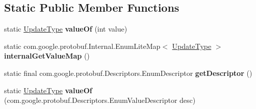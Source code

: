 \subsection*{Static Public Member Functions}
\begin{DoxyCompactItemize}
\item 
\mbox{\label{enumcom_1_1mysql_1_1cj_1_1x_1_1protobuf_1_1_mysqlx_crud_1_1_update_operation_1_1_update_type_a76b3138f10036eebc893804110d6b9cd}} 
static \mbox{\hyperlink{enumcom_1_1mysql_1_1cj_1_1x_1_1protobuf_1_1_mysqlx_crud_1_1_update_operation_1_1_update_type}{Update\+Type}} {\bfseries value\+Of} (int value)
\item 
\mbox{\label{enumcom_1_1mysql_1_1cj_1_1x_1_1protobuf_1_1_mysqlx_crud_1_1_update_operation_1_1_update_type_a5f92cd281c1693a61e0f79b88d48be7f}} 
static com.\+google.\+protobuf.\+Internal.\+Enum\+Lite\+Map$<$ \mbox{\hyperlink{enumcom_1_1mysql_1_1cj_1_1x_1_1protobuf_1_1_mysqlx_crud_1_1_update_operation_1_1_update_type}{Update\+Type}} $>$ {\bfseries internal\+Get\+Value\+Map} ()
\item 
\mbox{\label{enumcom_1_1mysql_1_1cj_1_1x_1_1protobuf_1_1_mysqlx_crud_1_1_update_operation_1_1_update_type_a967d36478ab5e545dbc5238677edab6c}} 
static final com.\+google.\+protobuf.\+Descriptors.\+Enum\+Descriptor {\bfseries get\+Descriptor} ()
\item 
\mbox{\label{enumcom_1_1mysql_1_1cj_1_1x_1_1protobuf_1_1_mysqlx_crud_1_1_update_operation_1_1_update_type_ab342d3f0e8900e8289585a1f06587904}} 
static \mbox{\hyperlink{enumcom_1_1mysql_1_1cj_1_1x_1_1protobuf_1_1_mysqlx_crud_1_1_update_operation_1_1_update_type}{Update\+Type}} {\bfseries value\+Of} (com.\+google.\+protobuf.\+Descriptors.\+Enum\+Value\+Descriptor desc)
\end{DoxyCompactItemize}
